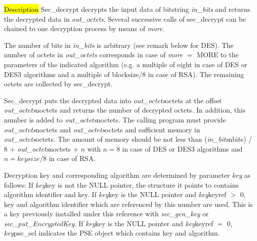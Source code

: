 

\hl{Description}
Sec\_decrypt decrypts the input data of bitstring {\em in\_bits} and returns the decrypted data
in {\em out\_octets}. Several successive calls of sec\_decrypt can be chained
to one decryption process by means of {\em more}.
          
The number of bits in {\em in\_bits} is arbitrary (see remark below for DES). The number of octets in {\em out\_octets}
corresponds in case of {\em more} $=$ MORE to the parameters of the indicated algorithm
(e.g. a multiple of eight in case of DES or DES3 algorithms and a multiple of blocksize/8
in case of RSA). The remaining octets are collected by sec\_decrypt.

Sec\_decrypt puts the decrypted data into {\em out\_octets}\pf octets at the offset
{\em out\_octets}\pf noctets and returns the number of decrypted octets. In addition, this number is added 
to {\em out\_octets}\pf noctets.
The calling program must provide {\em out\_octets}\pf noctets and {\em out\_octets}\pf octets and sufficient
memory in {\em out\_octets}\pf octets. 
The amount of memory should be not less than
({\em in\_bits}\pf nbits) $/$ 8 $+$ {\em out\_octets}\pf noctets $+$ $n$ with $n = 8$ 
in case of DES or DES3 algorithms and $n = keysize / 8$ in case of RSA.

Decryption key and corresponding algorithm are determined by parameter {\em key} as follows:
\be
\m If {\em key}\pf key is not the NULL pointer, the structure it points to
   contains algorithm identifier and key.
\m If {\em key}\pf key is the NULL pointer and {\em key}\pf keyref $>$ 0,
   key and algorithm identifier which are referenced by this number are used. This is a key
   previously installed under this reference with {\em sec\_gen\_key} or 
   {\em sec\_put\_EncryptedKey}.
\m If {\em key}\pf key is the NULL pointer and {\em key}\pf keyref $=$ 0,
   {\em key}\pf pse\_sel indicates the PSE object which contains key and algorithm.
\ee

